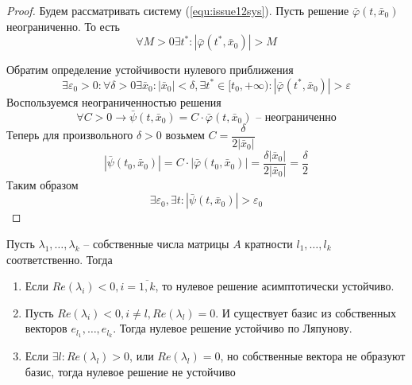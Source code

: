 \begin{proof}
	Будем рассматривать систему (\ref{equ:issue12sys}). Пусть решение $\bar{\varphi}(t, \bar{x}_0)$ неограниченно. То есть 
	\[
		\forall M>0 \exists t^*:|\bar{\varphi}(t^*, \bar{x}_0)|>M
	\]
	
	Обратим определение устойчивости нулевого приближения 
	\[
		\exists \varepsilon_0>0: \forall \delta>0 \exists \bar{x}_0: |\bar{x}_0|<\delta, \exists t^*\in[t_0, +\infty): |\bar{\varphi}(t^*, \bar{x}_0)|>\varepsilon
	\]
	Воспользуемся неограниченностью решения
	\[
		\forall C>0 \to \bar{\psi}(t, \bar{x}_0) = C\cdot\bar{\varphi}(t, \bar{x}_0) \text{ -- неограниченно} 
	\]
	Теперь для произвольного $\delta >0 $ возьмем $C = \dfrac{\delta}{2|\bar{x}_0|}$
	\[
		|\bar{\psi}(t_0, \bar{x}_0)| = C\cdot|\bar{\varphi}(t_0, \bar{x}_0)| = \frac{\delta |\bar{x}_0|}{2|\bar{x}_0|} = \frac{\delta}{2}
	\]
	Таким образом
	\[
		\exists \varepsilon_0, \exists t: 	|\bar{\psi}(t, \bar{x}_0)| > \varepsilon_0
	\]
\end{proof}

\begin{theorem}
	Пусть $\lambda_1, \dots, \lambda_k$ -- собственные числа матрицы $A$ кратности $l_1, \dots, l_k$ соответственно. Тогда
	\begin{enumerate}
		\item Если $Re(\lambda_i)<0, i=\overline{1, k}$, то нулевое решение асимптотически устойчиво.
		\item Пусть $Re(\lambda_i)<0, i\neq l, Re(\lambda_l)=0$. И существует базис из собственных векторов $e_{l_1}, \dots, e_{l_k}$. Тогда нулевое решение устойчиво по Ляпунову.
		\item Если $\exists l: Re(\lambda_l) > 0$, или $Re(\lambda_l) = 0$, но собственные вектора не образуют базис, тогда нулевое решение не устойчиво
	\end{enumerate}
\end{theorem}


